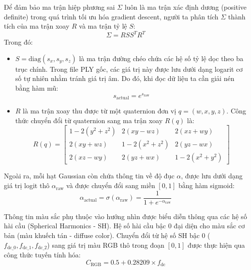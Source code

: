 \documentclass[a4paper,12pt]{report}
\begin{document}
Để đảm bảo ma trận hiệp phương sai $\Sigma$ luôn là ma trận xác định dương (positive definite) trong quá trình tối ưu hóa gradient descent, người ta phân tích $\Sigma$ thành tích của ma trận xoay $R$ và ma trận tỷ lệ $S$:
\begin{equation}
    \Sigma = R S S^T R^T
\end{equation}
Trong đó:
\begin{itemize}
    \item $S = \text{diag}(s_x, s_y, s_z)$ là ma trận đường chéo chứa các hệ số tỷ lệ dọc theo ba trục chính. Trong file PLY gốc, các giá trị này được lưu dưới dạng logarit cơ số tự nhiên nhằm tránh giá trị âm. Do đó, khi đọc dữ liệu ta cần giải nén bằng hàm mũ:
    \begin{equation}
        s_{\text{actual}} = e^{s_{\text{raw}}}
    \end{equation}
    \item $R$ là ma trận xoay thu được từ một quaternion đơn vị $q = (w, x, y, z)$. Công thức chuyển đổi từ quaternion sang ma trận xoay $R(q)$ là:
    \begin{equation}
        R(q) = \begin{bmatrix} 
        1 - 2(y^2+z^2) & 2(xy-wz) & 2(xz+wy) \\ 
        2(xy+wz) & 1 - 2(x^2+z^2) & 2(yz-wx) \\ 
        2(xz-wy) & 2(yz+wx) & 1 - 2(x^2+y^2) 
        \end{bmatrix}
    \end{equation}
\end{itemize}

Ngoài ra, mỗi hạt Gaussian còn chứa thông tin về độ đục $\alpha$, được lưu dưới dạng giá trị logit thô $\alpha_{\text{raw}}$ và được chuyển đổi sang miền $[0,1]$ bằng hàm sigmoid:
\begin{equation}
    \alpha_{\text{actual}} = \sigma(\alpha_{\text{raw}}) = \frac{1}{1 + e^{-\alpha_{\text{raw}}}}
\end{equation}

Thông tin màu sắc phụ thuộc vào hướng nhìn được biểu diễn thông qua các hệ số hài cầu (Spherical Harmonics - SH). Hệ số hài cầu bậc 0 đại diện cho màu sắc cơ bản (màu khuếch tán - diffuse color). Chuyển đổi từ hệ số SH bậc 0 ($f_{\text{dc\_0}}, f_{\text{dc\_1}}, f_{\text{dc\_2}}$) sang giá trị màu RGB thô trong đoạn $[0, 1]$ được thực hiện qua công thức tuyến tính hóa:
\begin{equation}
    C_{\text{RGB}} = 0.5 + 0.28209 \times f_{\text{dc}}
\end{equation}
\end{document}
